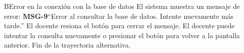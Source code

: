 \begin{UCtrayectoriaA}{B}{Error en la conexión con la base de datos}
\UCpaso El sistema muestra un mensaje de error: {\bf MSG-9}{``Error al consultar la base de datos. Intente nuevamente más tarde.''}
\UCpaso[\UCactor] El docente resiona el botón  para cerrar el mensaje.
\UCpaso[\UCactor] El docente puede intentar la consulta nuevamente o presionar el botón  para volver a la pantalla anterior.
\UCpaso Fin de la trayectoria alternativa.
\end{UCtrayectoriaA}

